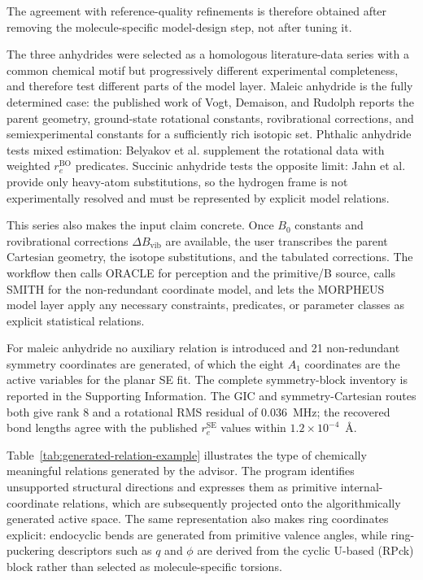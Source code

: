 \documentclass[aip,jcp,reprint,longbibliography,floatfix]{revtex4-2}
\begin{document}
The agreement with reference-quality refinements is therefore obtained after
removing the molecule-specific model-design step, not after tuning it.

The three anhydrides were selected as a homologous literature-data series
with a common chemical motif but progressively
different experimental completeness, and therefore test different parts of
the model layer. Maleic anhydride is the fully determined case: the published
work of Vogt, Demaison, and Rudolph\cite{Vogt2011MaleicAnhydride} reports the
parent geometry, ground-state rotational constants, rovibrational corrections,
and semiexperimental constants for a sufficiently rich isotopic set. Phthalic
anhydride tests mixed estimation: Belyakov et
al.\cite{Belyakov2022PhthalicAnhydride} supplement the rotational data with
weighted $r_e^\mathrm{BO}$ predicates. Succinic anhydride tests the opposite
limit: Jahn et al.\cite{Jahn2020SuccinicAnhydride} provide only heavy-atom
substitutions, so the hydrogen frame is not experimentally resolved and must be
represented by explicit model relations.

This series also makes the input claim concrete. Once $B_0$ constants and
rovibrational corrections $\Delta B_\mathrm{vib}$ are available, the
user transcribes the parent Cartesian geometry, the isotope
substitutions, and the tabulated corrections. The workflow then calls ORACLE
for perception and the primitive/B source, calls SMITH for the non-redundant
coordinate model, and lets the MORPHEUS model layer apply any necessary
constraints, predicates, or parameter classes as explicit statistical
relations.

For maleic anhydride no auxiliary relation is introduced and 21
non-redundant symmetry coordinates are generated, of which the eight $A_1$
coordinates are the active variables for the planar SE fit. The complete
symmetry-block inventory is reported in the Supporting Information.
The GIC and symmetry-Cartesian routes both give rank 8 and a rotational RMS
residual of 0.036~MHz; the recovered bond lengths agree with the published
$r_e^\mathrm{SE}$ values within $1.2\times10^{-4}$~\AA.

Table~\ref{tab:generated-relation-example} illustrates the type of chemically
meaningful relations generated by the advisor. The program
identifies unsupported structural directions and expresses them as primitive
internal-coordinate relations, which are subsequently projected onto the
algorithmically generated active space. The same representation also makes
ring coordinates explicit: endocyclic bends are generated from primitive
valence angles, while ring-puckering descriptors such as $q$ and $\phi$ are
derived from the cyclic U-based (RPck) block rather than selected as
molecule-specific torsions.
\end{document}
